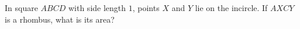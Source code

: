 In square $ABCD$ with side length $1$, points $X$ and $Y$ lie on the incircle. If $AXCY$ is a rhombus, what is its area?
